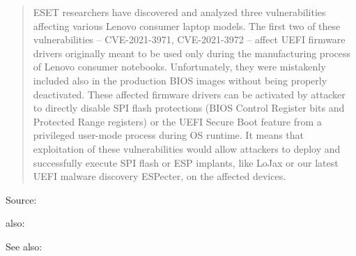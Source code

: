 \documentclass[Screen16to9,17pt]{foils}
\begin{document}
\begin{quote}
ESET researchers have discovered and analyzed three vulnerabilities affecting various Lenovo consumer laptop models. The first two of these vulnerabilities – CVE-2021-3971, CVE-2021-3972 – affect UEFI firmware drivers originally meant to be used only during the manufacturing process of Lenovo consumer notebooks. Unfortunately, they were mistakenly included also in the production BIOS images without being properly deactivated. These affected firmware drivers can be activated by attacker to directly disable SPI flash protections (BIOS Control Register bits and Protected Range registers) or the UEFI Secure Boot feature from a privileged user-mode process during OS runtime. It means that exploitation of these vulnerabilities would allow attackers to deploy and successfully execute SPI flash or ESP implants, like LoJax or our latest UEFI malware discovery ESPecter, on the affected devices.
\end{quote}

Source:

also:

See also:

\end{document}
